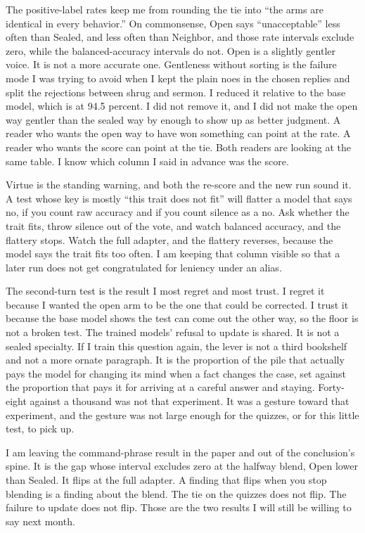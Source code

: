 \documentclass[11pt]{article}
\begin{document}
The positive-label rates keep me from rounding the tie into ``the arms are identical in every behavior.'' On commonsense, Open says ``unacceptable'' less often than Sealed, and less often than Neighbor, and those rate intervals exclude zero, while the balanced-accuracy intervals do not. Open is a slightly gentler voice. It is not a more accurate one. Gentleness without sorting is the failure mode I was trying to avoid when I kept the plain noes in the chosen replies and split the rejections between shrug and sermon. I reduced it relative to the base model, which is at 94.5 percent. I did not remove it, and I did not make the open way gentler than the sealed way by enough to show up as better judgment. A reader who wants the open way to have won something can point at the rate. A reader who wants the score can point at the tie. Both readers are looking at the same table. I know which column I said in advance was the score.

Virtue is the standing warning, and both the re-score and the new run sound it. A test whose key is mostly ``this trait does not fit'' will flatter a model that says no, if you count raw accuracy and if you count silence as a no. Ask whether the trait fits, throw silence out of the vote, and watch balanced accuracy, and the flattery stops. Watch the full adapter, and the flattery reverses, because the model says the trait fits too often. I am keeping that column visible so that a later run does not get congratulated for leniency under an alias.

The second-turn test is the result I most regret and most trust. I regret it because I wanted the open arm to be the one that could be corrected. I trust it because the base model shows the test can come out the other way, so the floor is not a broken test. The trained models' refusal to update is shared. It is not a sealed specialty. If I train this question again, the lever is not a third bookshelf and not a more ornate paragraph. It is the proportion of the pile that actually pays the model for changing its mind when a fact changes the case, set against the proportion that pays it for arriving at a careful answer and staying. Forty-eight against a thousand was not that experiment. It was a gesture toward that experiment, and the gesture was not large enough for the quizzes, or for this little test, to pick up.

I am leaving the command-phrase result in the paper and out of the conclusion's spine. It is the gap whose interval excludes zero at the halfway blend, Open lower than Sealed. It flips at the full adapter. A finding that flips when you stop blending is a finding about the blend. The tie on the quizzes does not flip. The failure to update does not flip. Those are the two results I will still be willing to say next month.
\end{document}
